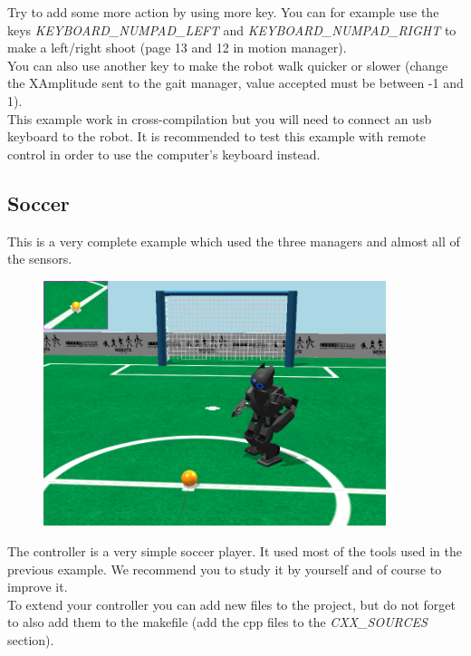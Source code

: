 \documentclass[a4paper, 12pt]{article}  		%
\begin{document}
Try to add some more action by using more key. You can for example use the keys \textit{KEYBOARD\_NUMPAD\_LEFT} and \textit{KEYBOARD\_NUMPAD\_RIGHT} to make a left/right shoot (page 13 and 12 in motion manager).\\

You can also use another key to make the robot walk quicker or slower (change the XAmplitude sent to the gait manager, value accepted must be between -1 and 1).\\

This example work in cross-compilation but you will need to connect an usb keyboard to the robot. It is recommended to test this example with remote control in order to use the computer's keyboard instead.\\


\newpage
\subsection{Soccer}

This is a very complete example which used the three managers and almost all of the sensors.\\

\begin{figure}[H]
\begin{center}
\includegraphics[width=10cm]{example_sample.png}
\label{example_sample.png}
\end{center}
\end{figure}

The controller is a very simple soccer player. It used most of the tools used in the previous example. We recommend you to study it by yourself and of course to improve it.\\

To extend your controller you can add new files to the project, but do not forget to also add them to the makefile (add the cpp files to the \textit{CXX\_SOURCES} section).\\
\end{document}
